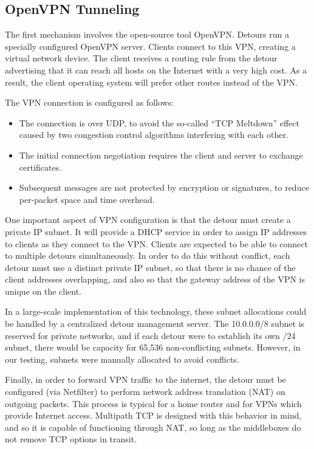\documentclass{cwru}
\begin{document}
\subsection{OpenVPN Tunneling}

The first mechanism involves the open-source tool OpenVPN. Detours run a
specially configured OpenVPN server. Clients connect to this VPN, creating a
virtual network device. The client receives a routing rule from the detour
advertising that it can reach all hosts on the Internet with a very high cost.
As a result, the client operating system will prefer other routes instead of the
VPN.

The VPN connection is configured as follows:

\begin{itemize}
\item The connection is over UDP, to avoid the so-called ``TCP Meltdown'' effect
  caused by two congestion control algorithms interfering with each other.
\item The initial connection negotiation requires the client and server to
  exchange certificates.
\item Subsequent messages are not protected by encryption or signatures, to
  reduce per-packet space and time overhead.
\end{itemize}

One important aspect of VPN configuration is that the detour must create a
private IP subnet. It will provide a DHCP service in order to assign IP
addresses to clients as they connect to the VPN. Clients are expected to be able
to connect to multiple detours simultaneously. In order to do this without
conflict, each detour must use a distinct private IP subnet, so that there is no
chance of the client addresses overlapping, and also so that the gateway address
of the VPN is unique on the client.

In a large-scale implementation of this technology, these subnet allocations
could be handled by a centralized detour management server. The 10.0.0.0/8
subnet is reserved for private networks, and if each detour were to establish
its own /24 subnet, there would be capacity for 65,536 non-conflicting subnets.
However, in our testing, subnets were manually allocated to avoid conflicts.

Finally, in order to forward VPN traffic to the internet, the detour must be
configured (via Netfilter) to perform network address translation (NAT) on
outgoing packets. This process is typical for a home router and for VPNs which
provide Internet access. Multipath TCP is designed with this behavior in mind,
and so it is capable of functioning through NAT, so long as the middleboxes do
not remove TCP options in transit.
\end{document}
